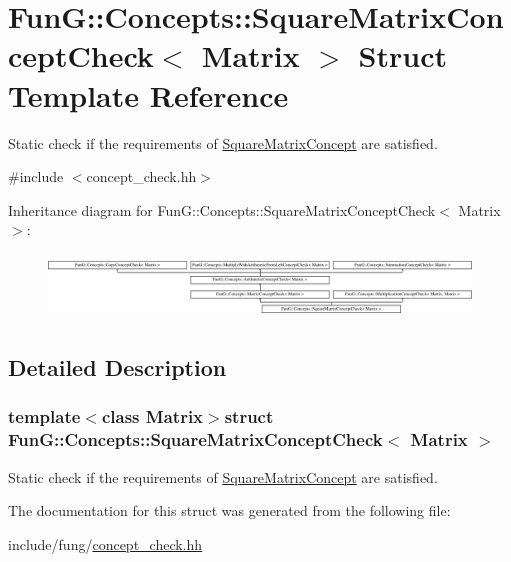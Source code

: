 \hypertarget{structFunG_1_1Concepts_1_1SquareMatrixConceptCheck}{\section{Fun\-G\-:\-:Concepts\-:\-:Square\-Matrix\-Concept\-Check$<$ Matrix $>$ Struct Template Reference}
\label{structFunG_1_1Concepts_1_1SquareMatrixConceptCheck}
}


Static check if the requirements of \hyperlink{structFunG_1_1Concepts_1_1SquareMatrixConcept}{Square\-Matrix\-Concept} are satisfied.  




{\ttfamily \#include $<$concept\-\_\-check.\-hh$>$}

Inheritance diagram for Fun\-G\-:\-:Concepts\-:\-:Square\-Matrix\-Concept\-Check$<$ Matrix $>$\-:\begin{figure}[H]
\begin{center}
\leavevmode
\includegraphics[height=1.728395cm]{structFunG_1_1Concepts_1_1SquareMatrixConceptCheck}
\end{center}
\end{figure}


\subsection{Detailed Description}
\subsubsection*{template$<$class Matrix$>$struct Fun\-G\-::\-Concepts\-::\-Square\-Matrix\-Concept\-Check$<$ Matrix $>$}

Static check if the requirements of \hyperlink{structFunG_1_1Concepts_1_1SquareMatrixConcept}{Square\-Matrix\-Concept} are satisfied. 

The documentation for this struct was generated from the following file\-:\begin{DoxyCompactItemize}
\item 
include/fung/\hyperlink{concept__check_8hh}{concept\-\_\-check.\-hh}\end{DoxyCompactItemize}
